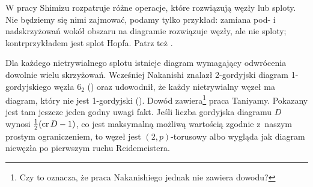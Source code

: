 W pracy \cite{shimizu14} Shimizu rozpatruje różne operacje, które rozwiązują węzły lub sploty.
Nie będziemy się nimi zajmować, podamy tylko przykład: zamiana pod- i nadskrzyżowań wokół obszaru na diagramie rozwiązuje węzły, ale nie sploty; kontrprzykładem jest splot Hopfa.
%
Patrz też \cite[s. 141-154]{kawauchi96}.

Dla każdego nietrywialnego splotu istnieje diagram wymagający odwrócenia dowolnie wielu skrzyżowań.
Wcześniej Nakanishi znalazł 2-gordyjski diagram 1-gordyjskiego węzła $6_2$ (\cite{nakanishi83}) oraz udowodnił, że każdy nietrywialny węzeł ma diagram, który nie jest 1-gordyjski (\cite{nakanishi96}).
Dowód zawiera\footnote{Czy to oznacza, że praca Nakanishiego jednak nie zawiera dowodu?} praca \cite{taniyama09} Taniyamy.
Pokazany jest tam jeszcze jeden godny uwagi fakt.
Jeśli liczba gordyjska diagramu $D$ wynosi $\frac 12 (\operatorname{cr} D - 1)$, co jest maksymalną możliwą wartością zgodnie z~naszym prostym ograniczeniem,
to węzeł jest $(2,p)$-torusowy albo wygląda jak diagram niewęzła po pierwszym ruchu Reidemeistera.













